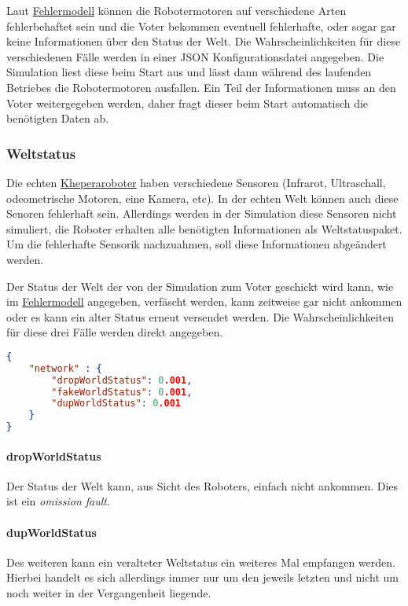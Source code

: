 Laut \hyperref[fm]{Fehlermodell} k{\"{o}}nnen die Robotermotoren auf verschiedene Arten fehlerbehaftet
sein und die Voter bekommen eventuell fehlerhafte, oder sogar gar keine Informationen {\"{u}}ber
den Status der Welt. Die Wahrscheinlichkeiten f{\"{u}}r diese verschiedenen F{\"{a}}lle
werden in einer JSON Konfigurationsdatei angegeben. Die Simulation liest diese beim Start aus und 
l{\"{a}}sst dann w{\"{a}}hrend des laufenden Betriebes die Robotermotoren ausfallen.
Ein Teil der Informationen muss an den Voter weitergegeben werden, daher fragt dieser beim Start
automatisch die ben{\"{o}}tigten Daten ab.


\subsubsection{Weltstatus}
Die echten \hyperref[khepera]{Kheperaroboter} haben verschiedene Sensoren (Infrarot, Ultraschall,
odeometrische Motoren, eine Kamera, etc). In der echten Welt k{\"{o}}nnen auch diese Senoren fehlerhaft
sein. Allerdings werden in der Simulation diese Sensoren nicht simuliert, die Roboter erhalten alle
ben{\"{o}}tigten Informationen als Weltstatuspaket. Um die fehlerhafte Sensorik nachzuahmen, soll diese
Informationen abge{\"{a}}ndert werden.

Der Status der Welt der von der Simulation zum Voter geschickt wird kann, wie im \hyperref[fm]{Fehlermodell} angegeben, verf{\"{a}}scht werden, kann zeitweise gar
nicht ankommen oder es kann ein alter Status erneut versendet werden. Die Wahrscheinlichkeiten f{\"{u}}r diese drei F{\"{a}}lle werden direkt angegeben.
\begin{lstlisting}[frame=single, language=json] 
{
	"network" : {
		"dropWorldStatus": 0.001,
		"fakeWorldStatus": 0.001,
		"dupWorldStatus": 0.001
	}
}
\end{lstlisting}

\paragraph{dropWorldStatus} Der Status der Welt kann, aus Sicht des Roboters, einfach nicht ankommen. Dies
	ist ein \textit{omission fault}.
\paragraph{dupWorldStatus} Des weiteren kann ein veralteter Weltstatus ein weiteres Mal empfangen werden.
    Hierbei handelt es sich allerdings immer nur um den jeweils letzten und nicht um noch weiter in
	der Vergangenheit liegende.
